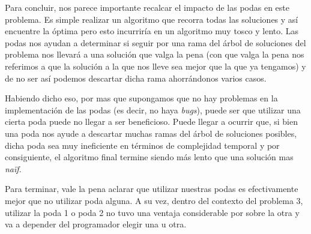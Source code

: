 Para concluir, nos parece importante recalcar el impacto de las podas en este problema. Es simple realizar un algoritmo que recorra todas las soluciones y así encuentre la óptima pero esto incurriría en un algoritmo muy tosco y lento. Las podas nos ayudan a determinar si seguir por una rama del árbol de soluciones del problema nos llevará a una solución que valga la pena (con que valga la pena nos referimos a que la solución a la que nos lleve sea mejor que la que ya tengamos) y de no ser así podemos descartar dicha rama ahorrándonos varios casos.

Habiendo dicho eso, por mas que supongamos que no hay problemas en la implementación de las podas (es decir, no haya \emph{bugs}), puede ser que utilizar una cierta poda puede no llegar a ser beneficioso. Puede llegar a ocurrir que, si bien una poda nos ayude a descartar muchas ramas del árbol de soluciones posibles, dicha poda sea muy ineficiente en términos de complejidad temporal y por consiguiente, el algoritmo final termine siendo más lento que una solución mas \emph{naïf}.

Para terminar, vale la pena aclarar que utilizar nuestras podas es efectivamente mejor que no utilizar poda alguna. A su vez, dentro del contexto del problema 3, utilizar la poda 1 o poda 2 no tuvo una ventaja considerable por sobre la otra y va a depender del programador elegir una u otra.
